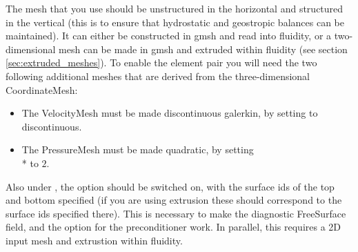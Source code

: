 The mesh that you use should be unstructured in the horizontal and structured
in the vertical (this is to ensure that hydrostatic and geostropic balances can
be maintained). It can either be constructed in gmsh and read into fluidity, or
a two-dimensional mesh can be made in gmsh and extruded within fluidity (see
section \ref{sec:extruded_meshes}). To enable the \PoDGPt element pair you will need
the two following additional meshes that are derived from the three-dimensional
CoordinateMesh:
\begin{itemize}
\item The VelocityMesh must be made discontinuous galerkin, by setting
   to discontinuous.  
\item The PressureMesh must be made quadratic, by setting
\\*   to $2$.  
\end{itemize}
Also under , the  option
should be switched on, with the surface ids of the top and bottom specified (if
you are using extrusion these should correspond to the surface ids specified
there). This is necessary to make the diagnostic FreeSurface field, and the
 option for the  preconditioner work. In
parallel, this requires a 2D input mesh and extrustion within fluidity.

